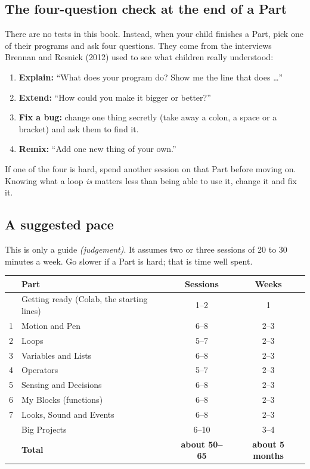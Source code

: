 \subsection*{The four-question check at the end of a Part}

There are no tests in this book. Instead, when your child finishes a Part, pick one of their programs and ask four questions. They come from the interviews Brennan and Resnick (2012) used to see what children really understood:

\begin{tcolorbox}[enhanced, colback=myblocks!10, colframe=myblocks!80!black, arc=6pt, boxrule=0.8pt, left=8pt]
\begin{enumerate}[leftmargin=*]
  \item \textbf{Explain:} ``What does your program do? Show me the line that does \ldots''
  \item \textbf{Extend:} ``How could you make it bigger or better?''
  \item \textbf{Fix a bug:} change one thing secretly (take away a colon, a space or a bracket) and ask them to find it.
  \item \textbf{Remix:} ``Add one new thing of your own.''
\end{enumerate}
\end{tcolorbox}

If one of the four is hard, spend another session on that Part before moving on. Knowing what a loop \emph{is} matters less than being able to use it, change it and fix it.

\subsection*{A suggested pace}

This is only a guide \textit{(judgement)}. It assumes two or three sessions of 20 to 30 minutes a week. Go slower if a Part is hard; that is time well spent.

\begin{center}
\renewcommand{\arraystretch}{1.1}
\begin{tabular}{l P{7.4cm} c c}
\toprule
 & \textbf{Part} & \textbf{Sessions} & \textbf{Weeks} \\
\midrule
 & Getting ready (Colab, the starting lines) & 1--2 & 1 \\
1 & Motion and Pen & 6--8 & 2--3 \\
2 & Loops & 5--7 & 2--3 \\
3 & Variables and Lists & 6--8 & 2--3 \\
4 & Operators & 5--7 & 2--3 \\
5 & Sensing and Decisions & 6--8 & 2--3 \\
6 & My Blocks (functions) & 6--8 & 2--3 \\
7 & Looks, Sound and Events & 6--8 & 2--3 \\
 & Big Projects & 6--10 & 3--4 \\
\midrule
 & \textbf{Total} & \textbf{about 50--65} & \textbf{about 5 months} \\
\bottomrule
\end{tabular}
\end{center}

